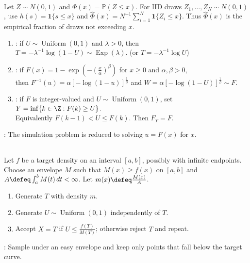 \begin{example} \label{ex:monte-carlo-normal-cdf} \\
Let $Z\sim N(0,1)$ and $\Phi(x)=\mathbb{P}(Z\leq x)$. For IID draws $Z_1,\ldots,Z_N\sim N(0,1)$, use $h(s)=\mathbf{1}\{s\leq x\}$ and $\widehat{\Phi}(x)=N^{-1}\sum\limits_{i=1}^{N}\mathbf{1}\{Z_i\leq x\}$. Thus $\widehat{\Phi}(x)$ is the empirical fraction of draws not exceeding $x$.
\end{example}

\begin{method} \label{meth:inverse-transform-simulation-examples} 
\begin{enumerate}[label=(\roman*)]
\setlength{\itemsep}{0pt}
\item {}: if $U\sim\operatorname{Uniform}(0,1)$ and $\lambda>0$, then $T=-\lambda^{-1}\log(1-U)\sim\operatorname{Exp}(\lambda)$. (or $T=-\lambda^{-1}\log U$)
\item {}: if $F(x)=1-\exp(-(\frac{x}{\alpha})^\beta)$ for $x\geq0$ and $\alpha,\beta>0$,\\
then $F^{-1}(u)=\alpha[-\log(1-u)]^{\frac{1}{\beta}}$ and $W=\alpha[-\log(1-U)]^{\frac{1}{\beta}}\sim F$.
\item {}: if $F$ is integer-valued and $U\sim\operatorname{Uniform}(0,1)$, set $Y=\inf\{k\in\Z:F(k)\geq U\}$.\\
Equivalently $F(k-1)<U\leq F(k)$. Then $F_Y=F$.
\end{enumerate}
: The simulation problem is reduced to solving $u=F(x)$ for $x$.
\end{method}

\begin{method} \label{method:rejection-sampling} \\
Let $f$ be a target density on an interval $[a,b]$, possibly with infinite endpoints.\\
Choose an envelope $M$ such that $M(x)\geq f(x)$ on $[a,b]$ and $A\defeq\int_a^b M(t)\,dt<\infty$. Let $m(x)\defeq \frac{M(x)}{A}$.
\begin{enumerate}[label=(\roman*)]
\setlength{\itemsep}{0pt}
\item Generate $T$ with density $m$.
\item Generate $U\sim\operatorname{Uniform}(0,1)$ independently of $T$.
\item Accept $X=T$ if $U\leq \frac{f(T)}{M(T)}$; otherwise reject $T$ and repeat.
\end{enumerate}
: Sample under an easy envelope and keep only points that fall below the target curve.
\end{method}

